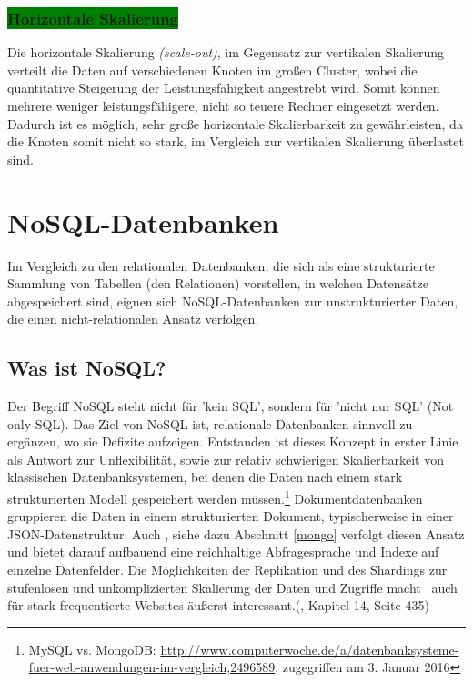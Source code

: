 \subsubsection{\colorbox{green}{Horizontale Skalierung}}

Die horizontale Skalierung \textit{(scale-out)}, im Gegensatz zur vertikalen Skalierung verteilt die Daten auf verschiedenen Knoten im großen Cluster, wobei die quantitative Steigerung der Leistungsfähigkeit angestrebt wird. Somit können mehrere weniger leistungsfähigere, nicht so teuere Rechner eingesetzt werden. Dadurch ist es möglich, sehr große horizontale Skalierbarkeit zu gewährleisten, da die Knoten somit nicht so stark, im Vergleich zur vertikalen Skalierung überlastet sind. 

\section{NoSQL-Datenbanken}
Im Vergleich zu den relationalen Datenbanken, die sich als eine strukturierte Sammlung von Tabellen (den Relationen) vorstellen, in welchen Datensätze abgespeichert sind, eignen sich NoSQL-Datenbanken zur unstrukturierter Daten, die einen nicht-relationalen Ansatz verfolgen. 


\subsection{Was ist NoSQL?}
Der Begriff NoSQL steht nicht für 'kein SQL', sondern für 'nicht nur SQL' (Not only SQL). Das Ziel von NoSQL ist, relationale Datenbanken sinnvoll zu ergänzen, wo sie Defizite aufzeigen. Entstanden ist dieses Konzept in erster Linie als Antwort zur Unflexibilität, sowie zur relativ schwierigen Skalierbarkeit von klassischen Datenbanksystemen, bei denen die Daten nach einem stark strukturierten Modell gespeichert werden müssen.\footnote{MySQL vs. MongoDB: \url{http://www.computerwoche.de/a/datenbanksysteme-fuer-web-anwendungen-im-vergleich,2496589}, zugegriffen am 3. Januar 2016} Dokumentdatenbanken gruppieren die Daten in einem strukturierten Dokument, typischerweise in einer JSON-Datenstruktur. Auch \mongo, siehe dazu Abschnitt \ref{mongo} verfolgt diesen Ansatz und bietet darauf aufbauend eine reichhaltige Abfragesprache und Indexe auf einzelne Datenfelder. Die Möglichkeiten der Replikation und des Shardings zur stufenlosen und unkomplizierten Skalierung der Daten und Zugriffe macht \mongo\ auch für stark frequentierte Websites äußerst interessant.(\cite{Hollosi.2012}, Kapitel 14, Seite 435)

